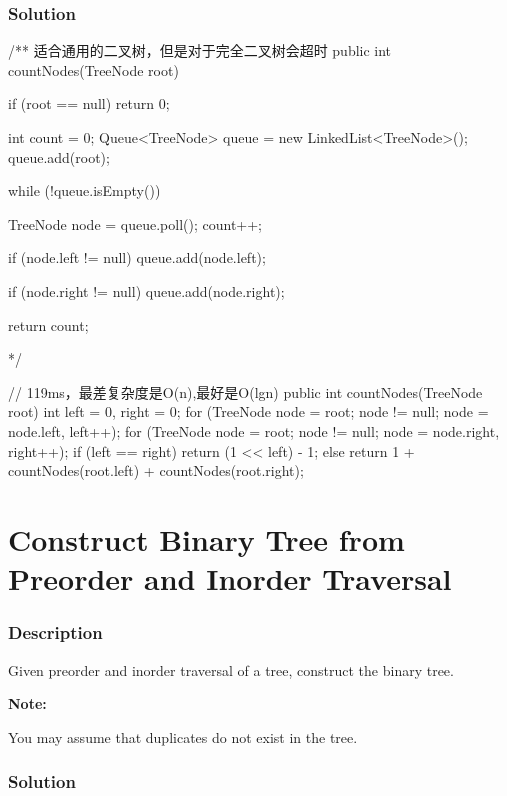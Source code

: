 \subsubsection{Solution}

\begin{Code}
/** 适合通用的二叉树，但是对于完全二叉树会超时
public int countNodes(TreeNode root) {
    if (root == null) {
        return 0;
    }

    int count = 0;
    Queue<TreeNode> queue = new LinkedList<TreeNode>();
    queue.add(root);

    while (!queue.isEmpty()) {
        TreeNode node = queue.poll();
        count++;

        if (node.left != null) {
            queue.add(node.left);
        }

        if (node.right != null) {
            queue.add(node.right);
        }
    }

    return count;
}*/

// 119ms，最差复杂度是O(n),最好是O(lgn)
public int countNodes(TreeNode root) {
    int left = 0, right = 0;
    for (TreeNode node = root; node != null; node = node.left, left++);
    for (TreeNode node = root; node != null; node = node.right, right++);
    if (left == right) {
        return (1 << left) - 1;
    } else {
        return 1 + countNodes(root.left) + countNodes(root.right);
    }
}
\end{Code}

\newpage

\section{Construct Binary Tree from Preorder and Inorder Traversal} %

\subsubsection{Description}
Given preorder and inorder traversal of a tree, construct the binary tree.

\textbf{Note:}

You may assume that duplicates do not exist in the tree.

\subsubsection{Solution}

